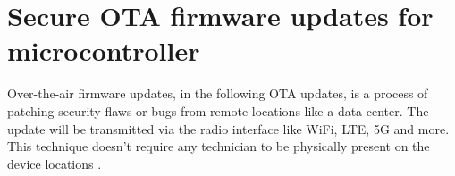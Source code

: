 \section{Secure OTA firmware updates for microcontroller}
Over-the-air firmware updates, in the following OTA updates, is a process of patching security flaws or bugs from remote locations like a data center. The update will be transmitted via the radio interface like WiFi, LTE, 5G and more. This technique doesn't require any technician to be physically present on the device locations \cite{Lethaby2018}.




